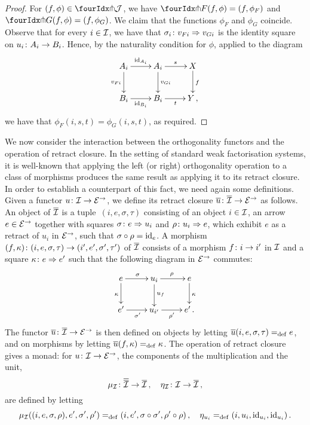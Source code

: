 \documentclass[reqno,10pt,a4paper,oneside]{amsart}
\begin{document}
\begin{proof} For $(f, \phi) \in \liftr{\cal{J}}$, we have $\liftr{F}(f, \phi) = (f, \phi_F)$ and $\liftr{G}(f, \phi) = (f, \phi_G)$.
We claim that the functions $\phi_F$ and $\phi_G$ coincide. Observe that 
for every $i \in \cal{I}$, we have that $\sigma_i \co v_{Fi}  \Rightarrow v_{Gi}$ is the identity square on $u_i
\co A_i \to B_i$. Hence, by the naturality condition for $\phi$, applied to the diagram 
\[
\xymatrix{
A_i \ar[r]^{\id_{A_i}} \ar[d]_{v_{Fi}}  & A_i \ar[d]^{v_{Gi}} \ar[r]^{s}  & X \ar[d]^{f} \\
B_i \ar[r]_{\id_{B_i}} & B_i \ar[r]_{t} & Y \, ,}
\]
we have  that $\phi_F(i, s, t) = \phi_G(i, s, t)$, as required.
\end{proof} 


We now consider the interaction between the orthogonality functors and the operation of retract closure. 
In the setting of standard weak factorisation systems, it is well-known that
applying the left (or right) orthogonality operation to a class of morphisms produces the same result as applying it to its retract closure. 
In order to establish a counterpart of this fact, we need again some definitions. 
Given a  functor $u \co \cal{I} \to \catE^{\to}$, we define its retract closure $\overline{u} \co \overline{\cal{I}} \to \catE^{\to}$ as follows. 
An object of $\overline{\cal{I}}$ is a tuple~$(i, e, \sigma, \tau)$ consisting of an object $i \in \cal{I}$, an arrow $e \in \cal{E}^\to$ together with squares $\sigma \co e \Rightarrow u_i$ and $\rho \co u_i \Rightarrow e$,
which exhibit $e$ as a retract of $u_i$ in  $\catE^{\to}$,  \ie such that $\sigma \cc \rho = \id_e$. 
A morphism $(f, \kappa) \co (i, e, \sigma, \tau) \to (i', e', \sigma', \tau')$ of $\overline{\cal{I}}$  consists of a morphism $f \co i \to i'$ in $\cal{I}$ and a square $\kappa \co e \Rightarrow e'$  such that the following diagram in $\cal{E}^\to$ commutes:
\[
\xymatrix{
  e
  \ar[r]^{\sigma}
    \ar[d]_{\kappa}
&
  u_i
  \ar[r]^{\rho}
  \ar[d]^{u_f}
&
  e
  \ar[d]^{\kappa}
\\
  e'
  \ar[r]_{\sigma'}
&
  u_{i'}
  \ar[r]_{\rho'}
&
  e' \, .
}
\]
The functor $\overline{u} \co \overline{\cal{I}} \to \catE^\to$ is then defined  on objects  by letting 
$\overline{u}(i, e, \sigma, \tau) \defeq e$,
and on morphisms by letting $\overline{u}(f, \kappa) \defeq \kappa$. The operation of retract closure gives a monad: for $u \co \cal{I} \to \catE^{\to}$,
the components of the multiplication and the unit, 
\[
\mu_\cal{I} \co \overline{\overline{\cal{I}}} \to \overline{\cal{I}} \, , \quad
\eta_\cal{I} \co \cal{I} \to \overline{\cal{I}} \, ,
\]
are defined by letting
\[
\mu_\cal{I}((i, e, \sigma,  \rho), e', \sigma', \rho') \defeq (i, e', \sigma \cc \sigma', \rho' \cc \rho) \, , \quad
\eta_{u_i} \defeq (i, u_i, \id_{u_i}, \id_{u_i}) \, .
\]
\end{document}
